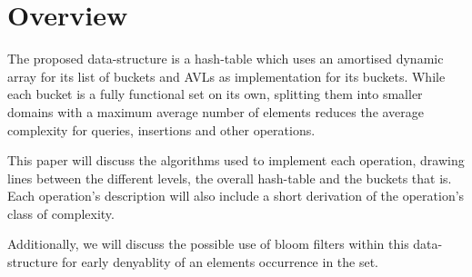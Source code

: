 \section{Overview}

    The proposed data-structure is a hash-table which uses an amortised dynamic
    array for its list of buckets and AVLs as implementation for its buckets.
    While each bucket is a fully functional set on its own, splitting them into
    smaller domains with a maximum average number of elements reduces the
    average complexity for queries, insertions and other operations.

    This paper will discuss the algorithms used to implement each operation,
    drawing lines between the different levels, the overall hash-table and the
    buckets that is. Each operation's description will also include a short
    derivation of the operation's class of complexity.

    Additionally, we will discuss the possible use of bloom filters within this
    data-structure for early denyablity of an elements occurrence in the set.


